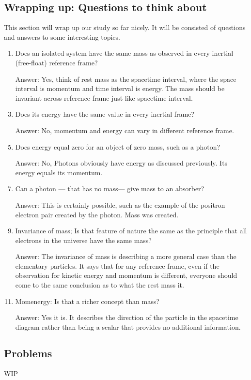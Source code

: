\documentclass[12pt]{book}
\begin{document}
\subsection{Wrapping up: Questions to think about}
This section will wrap up our study so far nicely. It will be consisted of questions and answers to some interesting topics. 
\begin{enumerate}

    \item Does an isolated system have the same mass as observed in every inertial (free-float) reference frame?
    \item[Answer:] Yes, think of rest mass as the spacetime interval, where the space interval is momentum and time interval is energy. The mass should be invariant across reference frame just like spacetime interval.
    \item Does its energy have the same value in every inertial frame?
    \item[Answer:]No, momentum and energy can vary in different reference frame. 
    \item Does energy equal zero for an object of zero mass, such as a photon?
    \item[Answer:]No, Photons obviously have energy as discussed previously. Its energy equals its momentum. 
    \item Can a photon — that has no mass— give mass to an absorber?
    \item[Answer:] This is certainly possible, such as the example of the positron electron pair created by the photon. Mass was created. 
    \item Invariance of mass; Is that feature of nature the same as the principle that all electrons in the universe have the same mass?
    \item[Answer:] The invariance of mass is describing a more general case than the elementary particles. It says that for any reference frame, even if the observation for kinetic energy and momentum is different, everyone should come to the same conclusion as to what the rest mass it.
    \item Momenergy: Is that a richer concept than mass?
    \item[Answer:] Yes it is. It describes the direction of the particle in the spacetime diagram rather than being a scalar that provides no additional information. 
\end{enumerate}

\subsection{Problems}
WIP
\end{document}
